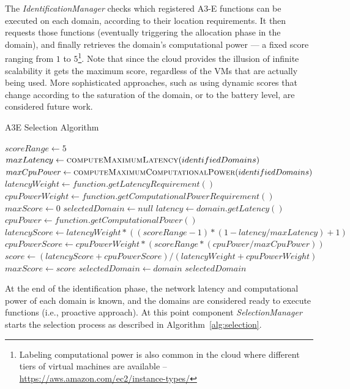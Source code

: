 The \textit{IdentificationManager} checks which registered A3-E functions can be executed on each domain, according to their location requirements. It then requests those functions (eventually triggering the allocation phase in the domain), and finally retrieves the domain's computational power --- a fixed score ranging from $1$ to $5$\footnote{Labeling computational power is also common in the cloud where different tiers of virtual machines are available -- \url{https://aws.amazon.com/ec2/instance-types/}}. %
Note that since the cloud provides the illusion of infinite scalability it gets the maximum score, regardless of the VMs that are actually being used. More sophisticated approaches, such as using dynamic scores that change according to the saturation of the domain, or to the battery level, are considered future work.  

\begin{algorithm}[b]
	\caption{A3E Selection Algorithm}
	\label{alg:selection}
	\begin{algorithmic}[1]
		
		\State$scoreRange \gets 5$
		\State $maxLatency \gets \Call{computeMaximumLatency}{identifiedDomains}$
		\State $maxCpuPower \gets \Call{computeMaximumComputationalPower}{identifiedDomains}$
		\State $latencyWeight \gets function.getLatencyRequirement()$ 
		\State $cpuPowerWeight \gets function.getComputationalPowerRequirement()$ 
		\State $maxScore \gets 0$
		\State $selectedDomain \gets null$
		\State $latency \gets domain.getLatency()$ 
		\State $cpuPower \gets function.getComputationalPower()$ 
		\State $latencyScore \gets latencyWeight*((scoreRange-1)*(1 - latency/maxLatency)+1)$ 
		\State $cpuPowerScore \gets cpuPowerWeight*(scoreRange*(cpuPower/maxCpuPower))$
		\State $score \gets (latencyScore + cpuPowerScore) / (latencyWeight + cpuPowerWeight)$
		\State $maxScore \gets score$
		\State $selectedDomain \gets domain$
		\EndIf
		\EndFor 
		\State \Return $selectedDomain$
		\EndFunction
	\end{algorithmic}
\end{algorithm}

At the end of the identification phase, the network latency and computational power of each domain is known, and the domains are considered ready to execute functions (i.e., proactive approach). At this point component \textit{SelectionManager} starts the selection process as described in Algorithm~\ref{alg:selection}. 

